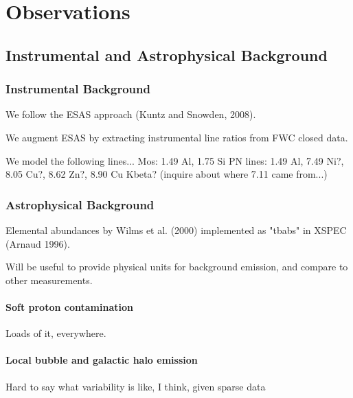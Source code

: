 \documentclass[manuscript]{aastex6}  %
\begin{document}


\section{Observations}

\subsection{Instrumental and Astrophysical Background}

\subsubsection{Instrumental Background}

We follow the ESAS approach (Kuntz and Snowden, 2008).

We augment ESAS by extracting instrumental line ratios from FWC closed data.

We model the following lines...
Mos: 1.49 Al, 1.75 Si
PN lines: 1.49 Al, 7.49 Ni?, 8.05 Cu?, 8.62 Zn?, 8.90 Cu Kbeta?
    (inquire about where 7.11 came from...)

\subsubsection{Astrophysical Background}

Elemental abundances by Wilms et al. (2000) implemented as "tbabs" in XSPEC
(Arnaud 1996).

Will be useful to provide physical units for background emission, and compare
to other measurements.

\paragraph{Soft proton contamination}

Loads of it, everywhere.

\paragraph{Local bubble and galactic halo emission}

Hard to say what variability is like, I think, given sparse data
\end{document}
